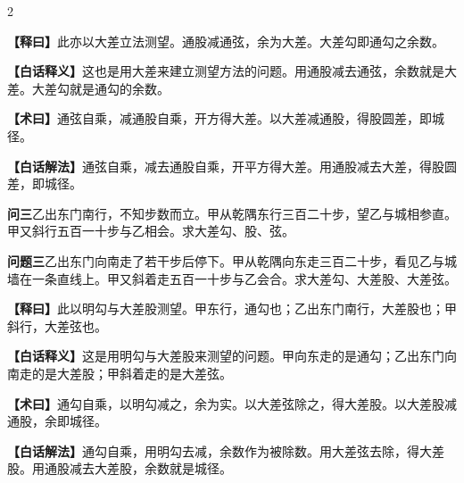 \documentclass[11pt,a4paper]{article}
\newcommand{\WenQuestion}[1]{\textbf{\textcolor{classicalcolor}{#1}}}
\newcommand{\BaiQuestion}[1]{\textbf{\textcolor{moderncolor}{#1}}}
\newcommand{\WenExplain}{\textcolor{classicalcolor}{\textbf{【释曰】}}}
\newcommand{\BaiExplain}{\textcolor{moderncolor}{\textbf{【白话释义】}}}
\newcommand{\WenMethod}{\textcolor{classicalcolor}{\textbf{【术曰】}}}
\newcommand{\BaiMethod}{\textcolor{moderncolor}{\textbf{【白话解法】}}}
\begin{document}
\begin{paracol}{2}
\switchcolumn*
\begin{tcolorbox}[colback=red!5,colframe=red!30!black,boxrule=0.3pt]
\WenExplain\quad 此亦以大差立法测望。通股减通弦，余为大差。大差勾即通勾之余数。
\end{tcolorbox}
\switchcolumn
\begin{tcolorbox}[colback=blue!5,colframe=blue!30!black,boxrule=0.3pt]
\BaiExplain\quad 这也是用大差来建立测望方法的问题。用通股减去通弦，余数就是大差。大差勾就是通勾的余数。
\end{tcolorbox}

\switchcolumn*
\begin{tcolorbox}[colback=red!5,colframe=red!40!black,boxrule=0.3pt]
\WenMethod\quad 通弦自乘，减通股自乘，开方得大差。以大差减通股，得股圆差，即城径。
\end{tcolorbox}
\switchcolumn
\begin{tcolorbox}[colback=blue!5,colframe=blue!40!black,boxrule=0.3pt]
\BaiMethod\quad 通弦自乘，减去通股自乘，开平方得大差。用通股减去大差，得股圆差，即城径。
\end{tcolorbox}

\vspace{0.8em}

\switchcolumn*
\begin{tcolorbox}[colback=red!3,colframe=red!30!black,boxrule=0.3pt]
\WenQuestion{问三}\quad 乙出东门南行，不知步数而立。甲从乾隅东行三百二十步，望乙与城相参直。甲又斜行五百一十步与乙相会。求大差勾、股、弦。
\end{tcolorbox}
\switchcolumn
\begin{tcolorbox}[colback=blue!3,colframe=blue!30!black,boxrule=0.3pt]
\BaiQuestion{问题三}\quad 乙出东门向南走了若干步后停下。甲从乾隅向东走三百二十步，看见乙与城墙在一条直线上。甲又斜着走五百一十步与乙会合。求大差勾、大差股、大差弦。
\end{tcolorbox}

\switchcolumn*
\begin{tcolorbox}[colback=red!5,colframe=red!30!black,boxrule=0.3pt]
\WenExplain\quad 此以明勾与大差股测望。甲东行，通勾也；乙出东门南行，大差股也；甲斜行，大差弦也。
\end{tcolorbox}
\switchcolumn
\begin{tcolorbox}[colback=blue!5,colframe=blue!30!black,boxrule=0.3pt]
\BaiExplain\quad 这是用明勾与大差股来测望的问题。甲向东走的是通勾；乙出东门向南走的是大差股；甲斜着走的是大差弦。
\end{tcolorbox}

\switchcolumn*
\begin{tcolorbox}[colback=red!5,colframe=red!40!black,boxrule=0.3pt]
\WenMethod\quad 通勾自乘，以明勾减之，余为实。以大差弦除之，得大差股。以大差股减通股，余即城径。
\end{tcolorbox}
\switchcolumn
\begin{tcolorbox}[colback=blue!5,colframe=blue!40!black,boxrule=0.3pt]
\BaiMethod\quad 通勾自乘，用明勾去减，余数作为被除数。用大差弦去除，得大差股。用通股减去大差股，余数就是城径。
\end{tcolorbox}

\end{paracol}
\end{document}
